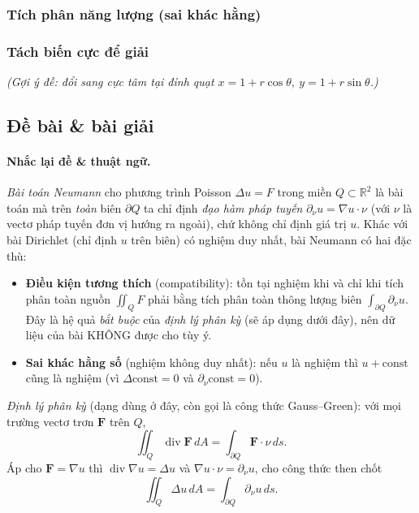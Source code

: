 \subsubsection*{Tích phân năng lượng (sai khác hằng)}

\subsubsection*{Tách biến cực để giải}

\emph{(Gợi ý đề: đổi sang cực tâm tại đỉnh quạt $x=1+r\cos\theta,\ y=1+r\sin\theta$.)}

\subsection*{Đề bài \& bài giải}
\paragraph{Nhắc lại đề \& thuật ngữ.}\leavevmode

\emph{Bài toán Neumann} cho phương trình Poisson $\Delta u=F$ trong miền $Q\subset\mathbb R^2$ là bài toán mà trên \emph{toàn} biên $\partial Q$ ta chỉ định \emph{đạo hàm pháp tuyến} $\partial_\nu u=\nabla u\cdot\nu$ (với $\nu$ là vectơ pháp tuyến đơn vị hướng ra ngoài), chứ không chỉ định giá trị $u$. Khác với bài Dirichlet (chỉ định $u$ trên biên) có nghiệm duy nhất, bài Neumann có hai đặc thù:
\begin{itemize}
\item \textbf{Điều kiện tương thích} (compatibility): tồn tại nghiệm khi và chỉ khi tích phân toàn nguồn $\iint_Q F$ phải bằng tích phân toàn thông lượng biên $\int_{\partial Q}\partial_\nu u$. Đây là hệ quả \emph{bắt buộc} của \emph{định lý phân kỳ} (sẽ áp dụng dưới đây), nên dữ liệu của bài KHÔNG được cho tùy ý.
\item \textbf{Sai khác hằng số} (nghiệm không duy nhất): nếu $u$ là nghiệm thì $u+\text{const}$ cũng là nghiệm (vì $\Delta\text{const}=0$ và $\partial_\nu\text{const}=0$).
\end{itemize}

\emph{Định lý phân kỳ} (dạng dùng ở đây, còn gọi là công thức Gauss--Green): với mọi trường vectơ trơn $\mathbf F$ trên $Q$,
\[
  \iint_Q \operatorname{div}\mathbf F\,dA=\int_{\partial Q}\mathbf F\cdot\nu\,ds.
\]
Áp cho $\mathbf F=\nabla u$ thì $\operatorname{div}\nabla u=\Delta u$ và $\nabla u\cdot\nu=\partial_\nu u$, cho công thức then chốt
\[
  \boxed{\;\iint_Q\Delta u\,dA=\int_{\partial Q}\partial_\nu u\,ds.\;}\tag{$\ast$}
\]

